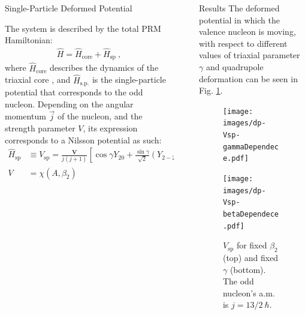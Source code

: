 \documentclass[final]{beamer}
\newlength{\sepwidth}
\newlength{\colwidth}
\newcommand{\separatorcolumn}{\begin{column}{\sepwidth}\end{column}}
\begin{document}
\begin{frame}[t]
\begin{columns}[t]
\begin{column}{\colwidth}
  \begin{block}{Single-Particle Deformed Potential}

The system is described by the total PRM Hamiltonian:
\begin{align}
    \hat{H}=\hat{H}_\text{core}+\hat{H}_\text{sp}\ ,
\end{align}
where $\hat{H}_\text{core}$ describes the dynamics of the triaxial core \cite{raduta2020new}, and $\hat{H}_\text{s.p.}$ is the single-particle potential that corresponds to the odd nucleon. Depending on the angular momentum $\vec{j}$ of the nucleon, and the strength parameter $V$, its expression corresponds to a Nilsson potential \cite{nilsson1955mat} as such:
\begin{align}
\hat{H}_\text{sp}&\equiv V_\text{sp}=\frac{\mathbf{V}}{j(j+1)}\left[\cos\gamma Y_{20}+\frac{\sin\gamma}{\sqrt{2}}\left(Y_{2-2}+Y_{22}\right)\right],\\
V&=\chi(A,\beta_2)
\end{align}


  \end{block}
  
\end{column}

\separatorcolumn

\begin{column}{\colwidth}


  \begin{block}{Results}
  The deformed potential in which the valence nucleon is moving, with respect to different values of triaxial parameter $\gamma$ and quadrupole deformation can be seen in Fig. \ref{gamma-beta-dev-v}.
 \begin{figure}
     \centering
     \texttt{[image: images/dp-Vsp-gammaDependece.pdf]}
     
     \texttt{[image: images/dp-Vsp-betaDependece.pdf]}
     \caption{$V_\text{sp}$ for fixed $\beta_2$ (top) and fixed $\gamma$ (bottom). The odd nucleon's a.m. is $j=13/2\ \hbar$.}
     \label{gamma-beta-dev-v}
 \end{figure}
  \end{block}
  

\end{column}
\end{columns}
\end{frame}
\end{document}
